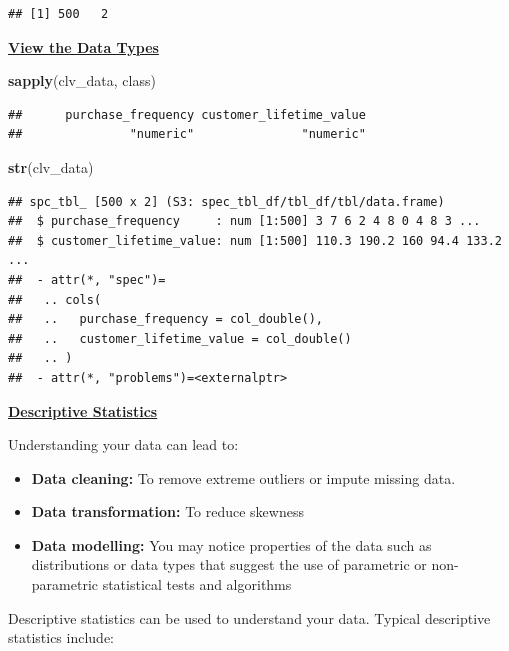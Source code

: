 \documentclass[
]{article}
\newenvironment{Shaded}{\begin{snugshade}}{\end{snugshade}}
\newcommand{\FunctionTok}[1]{\textcolor[rgb]{0.13,0.29,0.53}{\textbf{#1}}}
\newcommand{\NormalTok}[1]{#1}
\begin{document}
\begin{verbatim}
## [1] 500   2
\end{verbatim}

\ul{\textbf{View the Data Types}}

\begin{Shaded}
\begin{Highlighting}[]
\FunctionTok{sapply}\NormalTok{(clv\_data, class)}
\end{Highlighting}
\end{Shaded}

\begin{verbatim}
##      purchase_frequency customer_lifetime_value 
##               "numeric"               "numeric"
\end{verbatim}

\begin{Shaded}
\begin{Highlighting}[]
\FunctionTok{str}\NormalTok{(clv\_data)}
\end{Highlighting}
\end{Shaded}

\begin{verbatim}
## spc_tbl_ [500 x 2] (S3: spec_tbl_df/tbl_df/tbl/data.frame)
##  $ purchase_frequency     : num [1:500] 3 7 6 2 4 8 0 4 8 3 ...
##  $ customer_lifetime_value: num [1:500] 110.3 190.2 160 94.4 133.2 ...
##  - attr(*, "spec")=
##   .. cols(
##   ..   purchase_frequency = col_double(),
##   ..   customer_lifetime_value = col_double()
##   .. )
##  - attr(*, "problems")=<externalptr>
\end{verbatim}

\ul{\textbf{Descriptive Statistics}}

Understanding your data can lead to:

\begin{itemize}
\item
  \textbf{Data cleaning:} To remove extreme outliers or impute missing
  data.
\item
  \textbf{Data transformation:} To reduce skewness
\item
  \textbf{Data modelling:} You may notice properties of the data such as
  distributions or data types that suggest the use of parametric or
  non-parametric statistical tests and algorithms
\end{itemize}

Descriptive statistics can be used to understand your data. Typical
descriptive statistics include:
\end{document}
